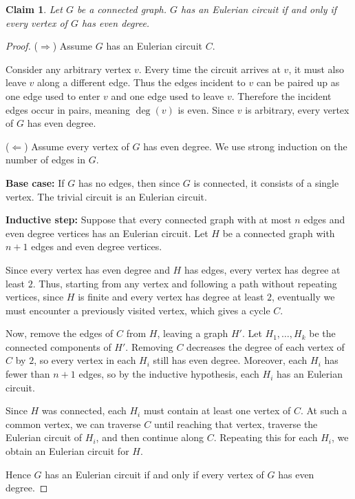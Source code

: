 \documentclass{article}
\newtheorem*{claim}{Claim}
\begin{document}
\begin{claim}
    Let $G$ be a connected graph. $G$ has an Eulerian circuit if and only if every vertex of $G$ has even degree.
\end{claim}

\begin{proof}
    ($\Longrightarrow$) Assume $G$ has an Eulerian circuit $C$.

    \medskip

    Consider any arbitrary vertex $v$. Every time the circuit arrives at $v$, it must also leave $v$ along a 
    different edge. Thus the edges incident to $v$ can be paired up as one edge used to enter $v$ and one edge 
    used to leave $v$. Therefore the incident edges occur in pairs, meaning $\deg(v)$ is even. Since $v$ is 
    arbitrary, every vertex of $G$ has even degree.

    \medskip

    ($\Longleftarrow$) Assume every vertex of $G$ has even degree. We use strong induction on the number of edges 
    in $G$.

    \medskip

    \textbf{Base case:} If $G$ has no edges, then since $G$ is connected, it consists of a single vertex. The 
    trivial circuit is an Eulerian circuit.

    \medskip

    \textbf{Inductive step:} Suppose that every connected graph with at most $n$ edges and even degree vertices 
    has an Eulerian circuit. Let $H$ be a connected graph with $n+1$ edges and even degree vertices. 

    \medskip
    
    Since every vertex has even degree and $H$ has edges, every vertex has degree at least $2$. Thus, starting 
    from any vertex and following a path without repeating vertices, since $H$ is finite and every vertex has 
    degree at least $2$, eventually we must encounter a previously visited vertex, which gives a cycle $C$.

    \medskip
    
    Now, remove the edges of $C$ from $H$, leaving a graph $H'$. Let $H_1,\dots,H_k$ be the connected components 
    of $H'$. Removing $C$ decreases the degree of each vertex of $C$ by $2$, so every vertex in each $H_i$ still 
    has even degree. Moreover, each $H_i$ has fewer than $n+1$ edges, so by the inductive hypothesis, each $H_i$ 
    has an Eulerian circuit.

    \medskip

    Since $H$ was connected, each $H_i$ must contain at least one vertex of $C$. At such a common vertex, we can 
    traverse $C$ until reaching that vertex, traverse the Eulerian circuit of $H_i$, and then continue along $C$. 
    Repeating this for each $H_i$, we obtain an Eulerian circuit for $H$.

    \medskip

    Hence $G$ has an Eulerian circuit if and only if every vertex of $G$ has even degree.
\end{proof}
\end{document}
